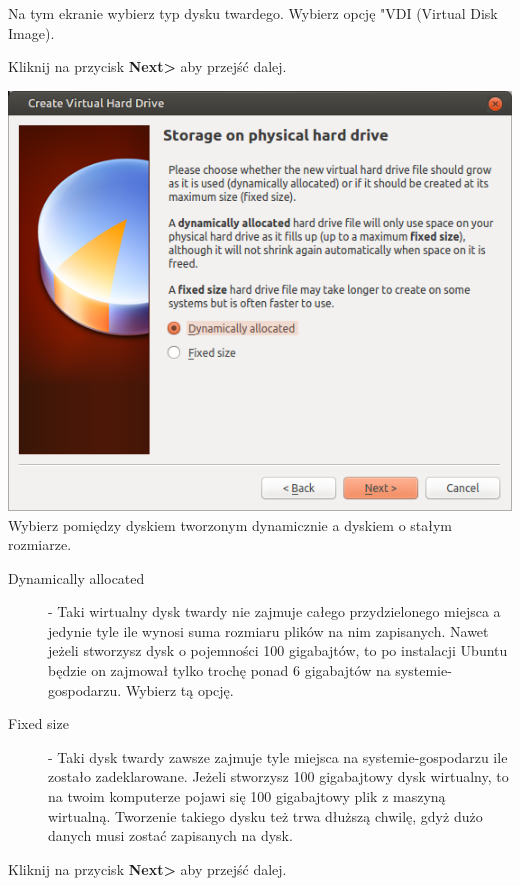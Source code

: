 Na tym ekranie wybierz typ dysku twardego. Wybierz opcję "VDI (Virtual Disk Image).
\begin{flushright}
Kliknij na przycisk \textbf{Next\textgreater} aby przejść dalej.
\end{flushright}
\clearpage
\twocolumn
\noindent\includegraphics[scale=0.7]{images/virtualbox_wizard5.png}
Wybierz pomiędzy dyskiem tworzonym dynamicznie a dyskiem o stałym rozmiarze.
\begin{description}
\item[Dynamically allocated] - Taki wirtualny dysk twardy nie zajmuje całego przydzielonego miejsca a jedynie tyle ile wynosi suma rozmiaru plików na nim zapisanych. Nawet jeżeli stworzysz dysk o pojemności 100 gigabajtów, to po instalacji Ubuntu będzie on zajmował tylko trochę ponad 6 gigabajtów na systemie-gospodarzu. Wybierz tą opcję.
\item[Fixed size] - Taki dysk twardy zawsze zajmuje tyle miejsca na systemie-gospodarzu ile zostało zadeklarowane. Jeżeli stworzysz 100 gigabajtowy dysk wirtualny, to na twoim komputerze pojawi się 100 gigabajtowy plik z maszyną wirtualną. Tworzenie takiego dysku też trwa dłuższą chwilę, gdyż dużo danych musi zostać zapisanych na dysk.
\end{description}
\begin{flushright}
Kliknij na przycisk \textbf{Next\textgreater} aby przejść dalej.
\end{flushright}
\onecolumn
\clearpage
